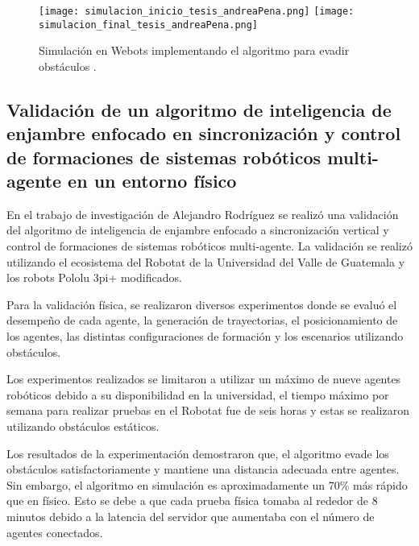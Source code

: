\begin{figure}[H]
	\centering
	\texttt{[image: simulacion\_inicio\_tesis\_andreaPena.png]} \texttt{[image: simulacion\_final\_tesis\_andreaPena.png]}
	\caption{Simulación en Webots implementando el algoritmo para evadir obstáculos \cite{imgRobotat}.}
	\label{fig:tesis_andreaPena}
\end{figure}

\subsection{Validación de un algoritmo de inteligencia de enjambre enfocado en sincronización y control de formaciones de sistemas robóticos multi-agente en un entorno físico}
En el trabajo de investigación de Alejandro Rodríguez \cite{RodriguezJA_2023_tesis}se realizó una validación del algoritmo de inteligencia de enjambre enfocado a sincronización vertical y control de formaciones de sistemas robóticos multi-agente. La validación se realizó utilizando el ecosistema del Robotat de la Universidad del Valle de Guatemala y los robots Pololu 3pi+ modificados.

Para la validación física, se realizaron diversos experimentos donde se evaluó el desempeño de cada agente, la generación de trayectorias, el posicionamiento de los agentes, las distintas configuraciones de formación y los escenarios utilizando obstáculos.

Los experimentos realizados se limitaron a utilizar un máximo de nueve agentes robóticos debido a su disponibilidad en la universidad, el tiempo máximo por semana para realizar pruebas en el Robotat fue de seis horas y estas se realizaron utilizando obstáculos estáticos.

Los resultados de la experimentación demostraron que, el algoritmo evade los obstáculos satisfactoriamente y mantiene una distancia adecuada entre agentes. Sin embargo, el algoritmo en simulación es aproximadamente un 70\% más rápido que en físico. Esto se debe a que cada prueba física tomaba al rededor de 8 minutos debido a la latencia del servidor que aumentaba con el número de agentes conectados. 


